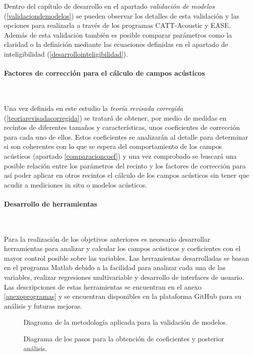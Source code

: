 Dentro del capítulo de desarrollo en el apartado \textit{validación de modelos} (\ref{validaciondemodelos}) se pueden observar los detalles de esta validación y las opciones para realizarla a través de los programas CATT-Acoustic y EASE. Además de esta validación también es posible comparar parámetros como la claridad o la definición mediante las ecuaciones definidas en el apartado de inteligibilidad (\ref{desarrollointeligibilidad}).

\paragraph{Factores de corrección para el cálculo de campos acústicos}~

Una vez definida en este estudio la \textit{teoría revisada corregida} (\ref{teoriarevisadacorregida}) se tratará de obtener, por medio de medidas en recintos de diferentes tamaños y características, unos coeficientes de corrección para cada uno de ellos. Estos coeficientes se analizarán al detalle para determinar si son coherentes con lo que se espera del comportamiento de los campos acústicos (apartado \ref{comparacioncoef}) y una vez comprobado se buscará una posible relación entre los parámetros del recinto y los factores de corrección para así poder aplicar en otros recintos el cálculo de los campos acústicos sin tener que acudir a mediciones in situ o modelos acústicos.

\paragraph{Desarrollo de herramientas}~

Para la realización de los objetivos anteriores es necesario desarrollar herramientas para analizar y calcular los campos acústicos y coeficientes con el mayor control posible sobre las variables. Las herramientas desarrolladas se basan en el programa Matlab debido a la facilidad para analizar cada una de las variables, realizar regresiones multivariable y desarrollo de interfaces de usuario. Las descripciones de estas herramientas se encuentran en el anexo \ref{anexoprogramas} y se encuentran disponibles en la plataforma GitHub para su análisis y futuras mejoras.

\begin{figure}[ht]
	\centering%
     {%
    }
    \caption{Diagrama de la metodología aplicada para la validación de modelos.}%
     \label{diagramametodo}%
\end{figure}
\FloatBarrier

\begin{figure}[ht]
	\centering%
     {%
    }
    \caption{Diagrama de los pasos para la obtención de coeficientes y posterior análisis.}%
     \label{diagramateoriarevisada}%
\end{figure}
\FloatBarrier
~




